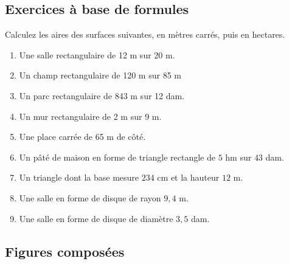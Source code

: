 \documentclass[12 pt]{extarticle}
\theoremstyle{plain}
\begin{document}
\subsection*{Exercices à base de formules}
Calculez les aires des surfaces suivantes, en mètres carrés, puis en hectares.
\begin{enumerate}
\item Une salle rectangulaire de 12 m sur 20 m.
\item Un champ rectangulaire de 120 m sur 85 m
\item Un parc rectangulaire de 843 m sur 12 dam. 
\item Un mur rectangulaire de 2 m sur 9 m. 
\item Une place carrée de 65 m de côté. 
\item Un pâté de maison en forme de triangle rectangle de $5$ hm sur $43$ dam. 
\item Un triangle dont la base mesure $234$ cm et la hauteur $12$ m. 
\item Une salle en forme de disque de rayon $9,4$ m. 
\item Une salle en forme de disque de diamètre $3,5$ dam. 
\
\end{enumerate}


\subsection*{Figures composées}
\end{document}
